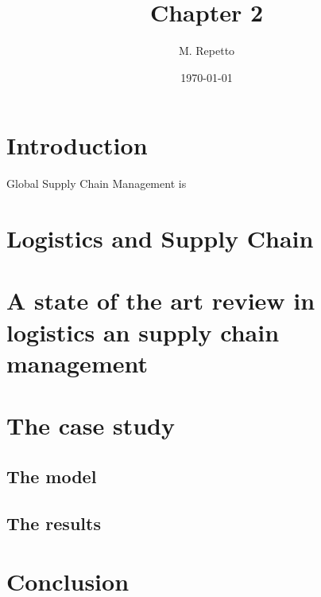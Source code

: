 \documentclass{article}
\begin{document}
\title{Chapter 2}

\author{M. Repetto}

\date{\today}

\maketitle

\begin{abstract}

\end{abstract}

\section{Introduction}
Global Supply Chain Management is 

\section{Logistics and Supply Chain}

\section{A state of the art review in logistics an supply chain management}

\section{The case study}
\subsection{The model}
\subsection{The results}

\section{Conclusion}
\end{document}
